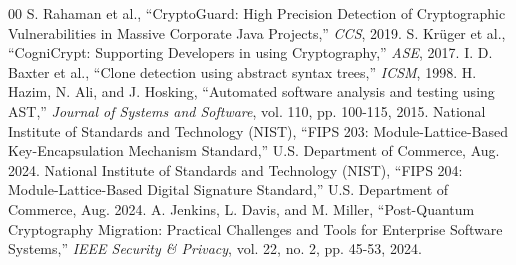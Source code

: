 \documentclass[conference]{IEEEtran}
\begin{document}
\begin{thebibliography}{00}
 S. Rahaman et al., ``CryptoGuard: High Precision Detection of Cryptographic Vulnerabilities in Massive Corporate Java Projects,'' \emph{CCS}, 2019.
 S. Krüger et al., ``CogniCrypt: Supporting Developers in using Cryptography,'' \emph{ASE}, 2017.
 I. D. Baxter et al., ``Clone detection using abstract syntax trees,'' \emph{ICSM}, 1998.
 H. Hazim, N. Ali, and J. Hosking, ``Automated software analysis and testing using AST,'' \emph{Journal of Systems and Software}, vol. 110, pp. 100-115, 2015.
 National Institute of Standards and Technology (NIST), ``FIPS 203: Module-Lattice-Based Key-Encapsulation Mechanism Standard,'' U.S. Department of Commerce, Aug. 2024.
 National Institute of Standards and Technology (NIST), ``FIPS 204: Module-Lattice-Based Digital Signature Standard,'' U.S. Department of Commerce, Aug. 2024.
 A. Jenkins, L. Davis, and M. Miller, ``Post-Quantum Cryptography Migration: Practical Challenges and Tools for Enterprise Software Systems,'' \emph{IEEE Security \& Privacy}, vol. 22, no. 2, pp. 45-53, 2024.
\end{thebibliography}
\end{document}
